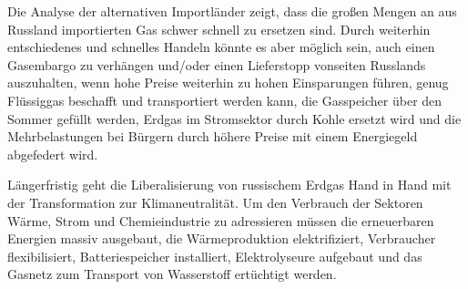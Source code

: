 Die Analyse der alternativen Importländer zeigt, dass die großen Mengen an aus Russland importierten Gas schwer schnell zu ersetzen sind. Durch weiterhin entschiedenes und schnelles Handeln könnte es aber möglich sein, auch einen Gasembargo zu verhängen und/oder einen Lieferstopp vonseiten Russlands auszuhalten, wenn hohe Preise weiterhin zu hohen Einsparungen führen,  genug Flüssiggas beschafft und transportiert werden kann, die Gasspeicher über den Sommer gefüllt werden, Erdgas im Stromsektor durch Kohle ersetzt wird und die Mehrbelastungen bei Bürgern durch höhere Preise mit einem Energiegeld abgefedert wird. 

Längerfristig geht die Liberalisierung von russischem Erdgas Hand in Hand mit der Transformation zur Klimaneutralität. Um den Verbrauch der Sektoren Wärme, Strom und Chemieindustrie zu adressieren müssen die erneuerbaren Energien massiv ausgebaut, die Wärmeproduktion elektrifiziert, Verbraucher flexibilisiert, Batteriespeicher installiert, Elektrolyseure aufgebaut und das Gasnetz zum Transport von Wasserstoff ertüchtigt werden.